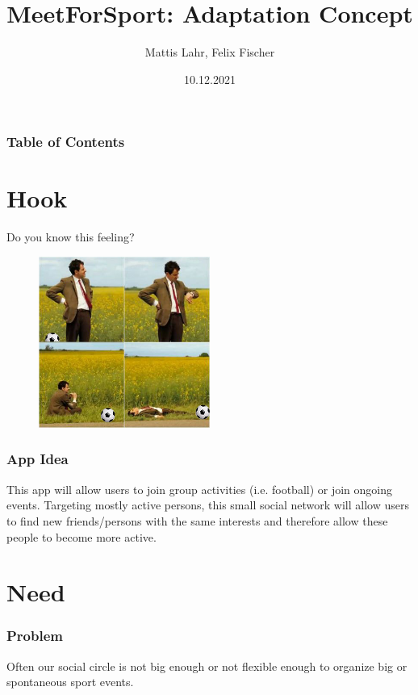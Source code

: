 \documentclass[aspectratio=169]{beamer}
\title{MeetForSport: Adaptation Concept}
\author{Mattis Lahr, Felix Fischer}
\date{10.12.2021}
\begin{document}
\maketitle



\begin{frame}
    \frametitle{Table of Contents}
    \tableofcontents
\end{frame}



\section{Hook}

\begin{frame}
Do you know this feeling?
 \begin{figure}
		\centering
			\includegraphics[width=0.5\textwidth]{media/bean.jpg}
		\end{figure}
\end{frame}



\begin{frame}
\frametitle{App Idea}
This app will allow users to join group activities (i.e. football) or join ongoing events.
Targeting mostly active persons, this small social network will allow users  to find new friends/persons with the same interests and therefore allow these people to become more active.
\end{frame}

\section{Need}
	\begin{frame}
		\frametitle{Problem}
		Often our social circle is not big enough or not flexible enough to organize big or spontaneous sport events.
	\end{frame}
\end{document}
